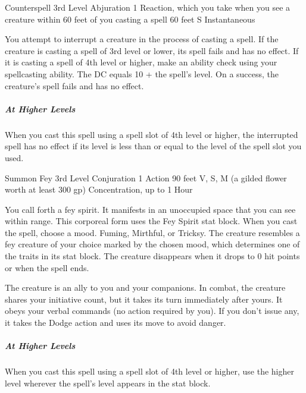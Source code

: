 \documentclass[letterpaper,openany,oneside,twocolumn]{book}
\begin{document}
\DndSpellHeader
  {Counterspell}
  {3rd Level Abjuration}
  {1 Reaction, which you take when you see a creature within 60 feet of you casting a spell}
  {60 feet}
  {S}
  {Instantaneous}
  
You attempt to interrupt a creature in the process of casting a spell. If the creature is casting a spell of 3rd level or lower, its spell fails and has no effect. If it is casting a spell of 4th level or higher, make an ability check using your spellcasting ability. The DC equals 10 + the spell’s level. On a success, the creature’s spell fails and has no effect.

\subparagraph*{At Higher Levels} When you cast this spell using a spell slot of 4th level or higher, the interrupted spell has no effect if its level is less than or equal to the level of the spell slot you used.

\DndSpellHeader
  {Summon Fey}
  {3rd Level Conjuration}
  {1 Action}
  {90 feet}
  {V, S, M (a gilded flower worth at least 300 gp)}
  {Concentration, up to 1 Hour}
  
You call forth a fey spirit. It manifests in an unoccupied space that you can see within range. This corporeal form uses the Fey Spirit stat block. When you cast the spell, choose a mood. Fuming, Mirthful, or Tricksy. The creature resembles a fey creature of your choice marked by the chosen mood, which determines one of the traits in its stat block. The creature disappears when it drops to 0 hit points or when the spell ends.

The creature is an ally to you and your companions. In combat, the creature shares your initiative count, but it takes its turn immediately after yours. It obeys your verbal commands (no action required by you). If you don’t issue any, it takes the Dodge action and uses its move to avoid danger.

\subparagraph*{At Higher Levels} When you cast this spell using a spell slot of 4th level or higher, use the higher level wherever the spell's level appears in the stat block.
\end{document}
